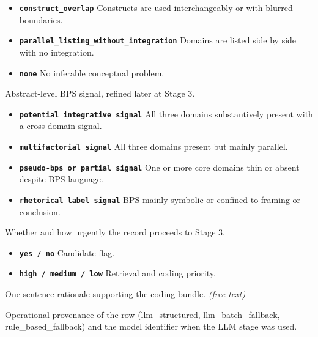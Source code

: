 \documentclass[11pt]{article}
\begin{document}
\begin{description}
\begin{itemize}[leftmargin=1.3em,itemsep=2pt,topsep=2pt]
  \item \textbf{\texttt{construct\_overlap}} Constructs are used interchangeably or with blurred boundaries.
  \item \textbf{\texttt{parallel\_listing\_without\_integration}} Domains are listed side by side with no integration.
  \item \textbf{\texttt{none}} No inferable conceptual problem.
  \end{itemize}
\item[\texttt{provisional\_typology}] Abstract-level BPS signal, refined later at Stage 3.
  \begin{itemize}[leftmargin=1.3em,itemsep=2pt,topsep=2pt]
  \item \textbf{\texttt{potential integrative signal}} All three domains substantively present with a cross-domain signal.
  \item \textbf{\texttt{multifactorial signal}} All three domains present but mainly parallel.
  \item \textbf{\texttt{pseudo-bps or partial signal}} One or more core domains thin or absent despite BPS language.
  \item \textbf{\texttt{rhetorical label signal}} BPS mainly symbolic or confined to framing or conclusion.
  \end{itemize}
\item[\texttt{stage3\_candidate / stage3\_priority}] Whether and how urgently the record proceeds to Stage 3.
  \begin{itemize}[leftmargin=1.3em,itemsep=2pt,topsep=2pt]
  \item \textbf{\texttt{yes / no}} Candidate flag.
  \item \textbf{\texttt{high / medium / low}} Retrieval and coding priority.
  \end{itemize}
\item[\texttt{coding\_rationale}] One-sentence rationale supporting the coding bundle. \textit{(free text)}
\item[\texttt{coding\_method / llm\_model}] Operational provenance of the row (llm\_structured, llm\_batch\_fallback, rule\_based\_fallback) and the model identifier when the LLM stage was used.
\end{description}
\end{document}
